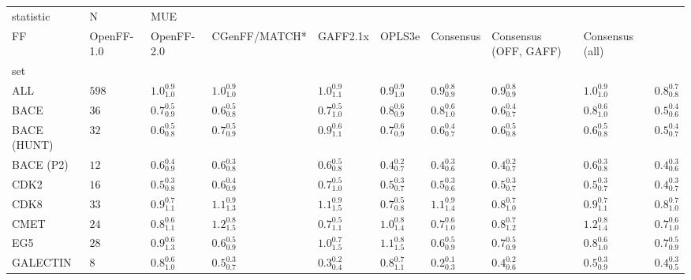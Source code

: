 \begin{tabular}{llllllllll}
\toprule
statistic &      N & \multicolumn{8}{l}{MUE} \\
FF &         OpenFF-1.0 &         OpenFF-2.0 &      CGenFF/MATCH* &           GAFF2.1x &             OPLS3e &          Consensus & Consensus (OFF, GAFF) &    Consensus (all) \\
set         &        &                    &                    &                    &                    &                    &                    &                       &                    \\
\midrule
ALL         &  $598$ &  $1.0^{0.9}_{1.0}$ &  $1.0^{0.9}_{1.0}$ &  $1.0^{0.9}_{1.1}$ &  $0.9^{0.9}_{1.0}$ &  $0.9^{0.8}_{0.9}$ &  $0.9^{0.8}_{0.9}$ &     $1.0^{0.9}_{1.0}$ &  $0.8^{0.7}_{0.8}$ \\
BACE        &   $36$ &  $0.7^{0.5}_{0.9}$ &  $0.6^{0.5}_{0.8}$ &  $0.7^{0.5}_{1.0}$ &  $0.8^{0.6}_{0.9}$ &  $0.8^{0.6}_{1.0}$ &  $0.6^{0.4}_{0.7}$ &     $0.8^{0.6}_{1.0}$ &  $0.5^{0.4}_{0.6}$ \\
BACE (HUNT) &   $32$ &  $0.6^{0.5}_{0.8}$ &  $0.7^{0.5}_{0.9}$ &  $0.9^{0.6}_{1.1}$ &  $0.7^{0.6}_{0.9}$ &  $0.6^{0.4}_{0.7}$ &  $0.6^{0.5}_{0.8}$ &     $0.6^{0.5}_{0.8}$ &  $0.5^{0.4}_{0.7}$ \\
BACE (P2)   &   $12$ &  $0.6^{0.4}_{0.9}$ &  $0.6^{0.3}_{0.8}$ &  $0.6^{0.5}_{0.8}$ &  $0.4^{0.2}_{0.7}$ &  $0.4^{0.3}_{0.6}$ &  $0.4^{0.2}_{0.7}$ &     $0.6^{0.3}_{0.8}$ &  $0.4^{0.3}_{0.6}$ \\
CDK2        &   $16$ &  $0.5^{0.3}_{0.8}$ &  $0.6^{0.4}_{0.9}$ &  $0.7^{0.5}_{1.0}$ &  $0.5^{0.3}_{0.7}$ &  $0.5^{0.3}_{0.6}$ &  $0.5^{0.3}_{0.7}$ &     $0.5^{0.3}_{0.7}$ &  $0.4^{0.3}_{0.7}$ \\
CDK8        &   $33$ &  $0.9^{0.7}_{1.1}$ &  $1.1^{0.9}_{1.3}$ &  $1.1^{0.9}_{1.5}$ &  $0.7^{0.5}_{0.8}$ &  $1.1^{0.9}_{1.4}$ &  $0.8^{0.7}_{1.0}$ &     $0.9^{0.7}_{1.1}$ &  $0.8^{0.7}_{1.0}$ \\
CMET        &   $24$ &  $0.8^{0.6}_{1.1}$ &  $1.2^{0.8}_{1.5}$ &  $0.7^{0.5}_{1.1}$ &  $1.0^{0.8}_{1.4}$ &  $0.7^{0.6}_{1.0}$ &  $0.8^{0.7}_{1.2}$ &     $1.2^{0.8}_{1.4}$ &  $0.7^{0.6}_{1.0}$ \\
EG5         &   $28$ &  $0.9^{0.6}_{1.3}$ &  $0.6^{0.5}_{0.9}$ &  $1.0^{0.7}_{1.5}$ &  $1.1^{0.8}_{1.5}$ &  $0.6^{0.5}_{0.9}$ &  $0.7^{0.5}_{0.9}$ &     $0.8^{0.6}_{1.0}$ &  $0.7^{0.5}_{0.9}$ \\
GALECTIN    &    $8$ &  $0.8^{0.6}_{1.0}$ &  $0.5^{0.3}_{0.7}$ &  $0.3^{0.2}_{0.4}$ &  $0.8^{0.7}_{1.1}$ &  $0.2^{0.1}_{0.3}$ &  $0.4^{0.2}_{0.6}$ &     $0.5^{0.3}_{0.9}$ &  $0.4^{0.3}_{0.5}$ \\

\end{tabular}
